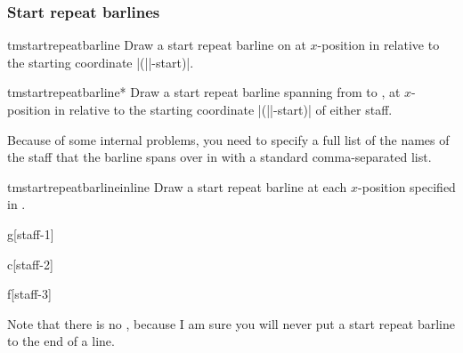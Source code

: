 \documentclass[11pt,a4paper]{ltxdoc}
\begin{document}
\subsubsection{Start repeat barlines}\label{sec:multistaff:barlines:start}
\begin{docCommand}{tmstartrepeatbarline}{}
  Draw a start repeat barline on  at $x$-position  in 
  relative to the starting coordinate |(||-start)|.
\end{docCommand}
\begin{docCommand}{tmstartrepeatbarline*}{}
  Draw a start repeat barline spanning from  to 
  , at $x$-position  in relative to 
  the starting coordinate |(||-start)| of either staff.

  Because of some internal problems, you need to specify a full list of the names 
  of the staff that the barline spans over in  with 
  a standard comma-separated list.
\end{docCommand}
\begin{docCommand}{tmstartrepeatbarlineinline}{}
  Draw a start repeat barline at each $x$-position specified in .
\end{docCommand}
\begin{dispExample}
\begin{tmmultiplestaves}[0pt]%
  \begin{tmstaff}{g}[staff-1]
  \end{tmstaff}%
  \begin{tmstaff}{c}[staff-2]
  \end{tmstaff}%
  \begin{tmstaff}{f}[staff-3]
  \end{tmstaff}%
\end{tmmultiplestaves}
\end{dispExample}
\begin{caution}
  Note that there is no , because I am sure you 
  will never put a start repeat barline to the end of a line.
\end{caution}
\end{document}
